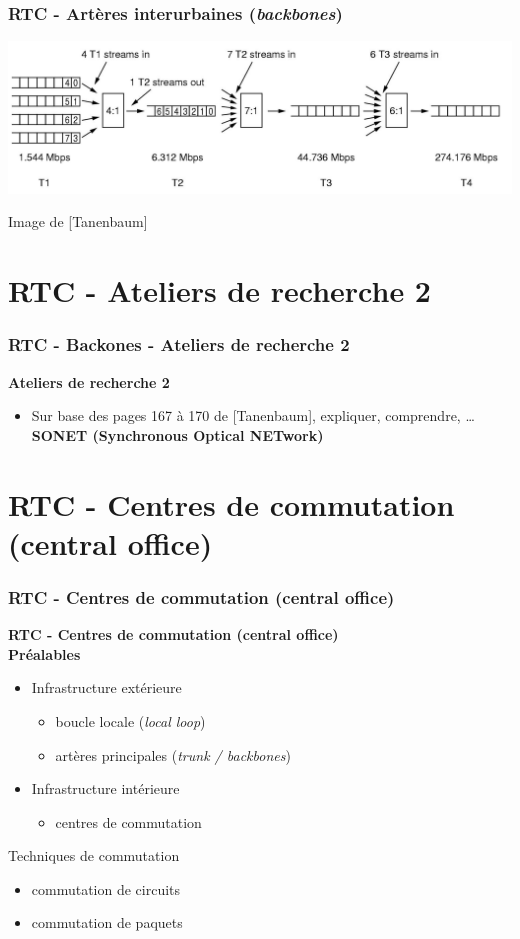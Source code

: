 \begin{frame}[fragile]
	\frametitle{RTC - Artères interurbaines (\textit{backbones})}
\begin{center}
	\includegraphics[width=.9\linewidth]{img/2-28-old.jpg}
	\par{\scriptsize Image de [Tanenbaum]} 
\end{center}
\end{frame}



\section{RTC - Ateliers de recherche 2}

\begin{frame}[fragile]
	\frametitle{RTC - Backones - Ateliers de recherche 2}
{\large\bf Ateliers de recherche 2} 
\begin{itemize}
	\item Sur base des pages 167 à 170 de [Tanenbaum], expliquer, comprendre, …
	\textbf{SONET (Synchronous Optical NETwork)}
\end{itemize}
\end{frame}



\section{RTC - Centres de commutation (central office)}

\begin{frame}[fragile]
  \frametitle{RTC - Centres de commutation (central office)}
{\Large\bf RTC - Centres de commutation (central office)}\\
{\large\bf Préalables}
\begin{itemize}
	\item Infrastructure extérieure
	\begin{itemize}
		\item boucle locale (\textit{local loop})
		\item artères principales (\textit{trunk / backbones})
	\end{itemize}
	\item Infrastructure intérieure
	\begin{itemize}
		\item centres de commutation
	\end{itemize}
\end{itemize}
\vspace{.5cm}
Techniques de commutation
\begin{itemize}
	\item commutation de circuits
	\item commutation de paquets
\end{itemize}
\end{frame}

